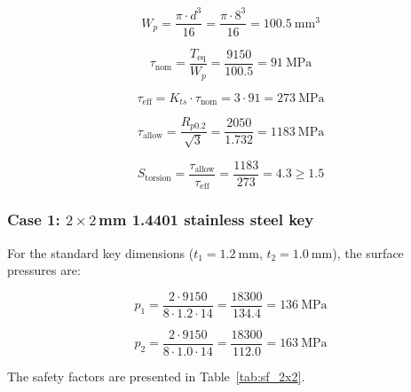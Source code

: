 \documentclass[11pt,a4paper,twoside,openright]{book}
\begin{document}
\begin{equation}
    W_p = \frac{\pi \cdot d^3}{16} = \frac{\pi \cdot 8^3}{16} = \SI{100.5}{\milli\metre\cubed}
    \label{eq:polar_modulus}
\end{equation}
 
\begin{equation}
    \tau_{\text{nom}} = \frac{T_{\text{eq}}}{W_p} = \frac{9150}{100.5} = \SI{91}{\mega\pascal}
    \label{eq:torsion_stress}
\end{equation}
 
\begin{equation}
    \tau_{\text{eff}} = K_{ts} \cdot \tau_{\text{nom}} = 3\cdot 91 = \SI{273}{\mega\pascal}
    \label{eq:torsion_stress_eff}
\end{equation}
 
\begin{equation}
    \tau_{\text{allow}} = \frac{R_{p0.2}}{\sqrt{3}} = \frac{2050}{1.732} = \SI{1183}{\mega\pascal}
    \label{eq:torsion_allow}
\end{equation}
 
\begin{equation}
    S_{\text{torsion}} = \frac{\tau_{\text{allow}}}{\tau_{\text{eff}}} = \frac{1183}{273} = 4.3 \geq 1.5
    \label{eq:torsion_sf}
\end{equation}

\subsubsection{Case 1: $2 \times 2$\,\si{\milli\metre} 1.4401 stainless steel key}
 
For the standard key dimensions ($t_1 = \SI{1.2}{\milli\metre}$, $t_2 = \SI{1.0}{\milli\metre}$), the surface pressures are:
 
\begin{equation}
    p_1 = \frac{2 \cdot 9150}{8 \cdot 1.2 \cdot 14} = \frac{18300}{134.4} = \SI{136}{\mega\pascal}
    \label{eq:p1_2x2}
\end{equation}
 
\begin{equation}
    p_2 = \frac{2 \cdot 9150}{8 \cdot 1.0 \cdot 14} = \frac{18300}{112.0} = \SI{163}{\mega\pascal}
    \label{eq:p2_2x2}
\end{equation}
 
The safety factors are presented in Table~\ref{tab:sf_2x2}.
 
\end{document}

